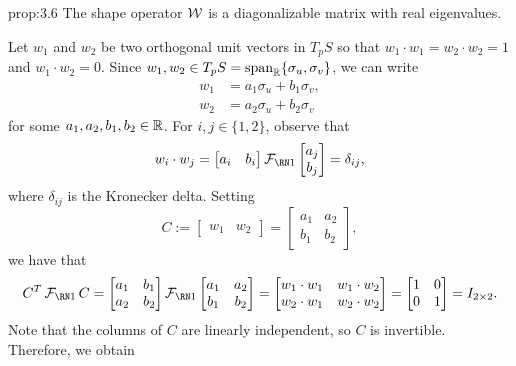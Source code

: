 \begin{prop}{prop:3.6}
    The shape operator ${\cal W}$ is a diagonalizable matrix with real eigenvalues.
\end{prop}\vspace{-0.25cm}
\begin{pf}
    Let $w_1$ and $w_2$ be two orthogonal unit vectors in $T_pS$ so that 
    $w_1 \cdot w_1 = w_2 \cdot w_2 = 1$ and $w_1 \cdot w_2 = 0$. Since 
    $w_1, w_2 \in T_pS = \operatorname{span}_{\mathbb{R}}\{\sigma_u, \sigma_v\}$, we can write 
    \begin{align*}
        w_1 &= a_1\sigma_u + b_1\sigma_v, \\ 
        w_2 &= a_2\sigma_u + b_2\sigma_v 
    \end{align*}
    for some $a_1, a_2, b_1, b_2 \in \mathbb{R}$. For $i, j \in \{1, 2\}$, observe that 
    \[ w_i \cdot w_j = \begin{bmatrix}
        a_i & b_i
    \end{bmatrix} \FFF \begin{bmatrix}
        a_j \\ b_j 
    \end{bmatrix} = \delta_{ij}, \] 
    where $\delta_{ij}$ is the Kronecker delta. Setting 
    \[ C := \left[ \begin{array}{c|c} \!\!\! w_1 & w_2 \!\!\! \end{array} \right] 
    = \begin{bmatrix}
        a_1 & a_2 \\ b_1 & b_2 
    \end{bmatrix}, \] 
    we have that 
    \[ C^T \FFF C = \begin{bmatrix}
        a_1 & b_1 \\ a_2 & b_2 
    \end{bmatrix} \FFF \begin{bmatrix}
        a_1 & a_2 \\ b_1 & b_2 
    \end{bmatrix} = \begin{bmatrix}
        w_1 \cdot w_1 & w_1 \cdot w_2 \\ 
        w_2 \cdot w_1 & w_2 \cdot w_2 
    \end{bmatrix} = \begin{bmatrix}
        1 & 0 \\ 0 & 1 
    \end{bmatrix} = I_{2\times 2}. \] 
    Note that the columns of $C$ are linearly independent, so $C$ is invertible. 
    Therefore, we obtain 

\end{pf}
